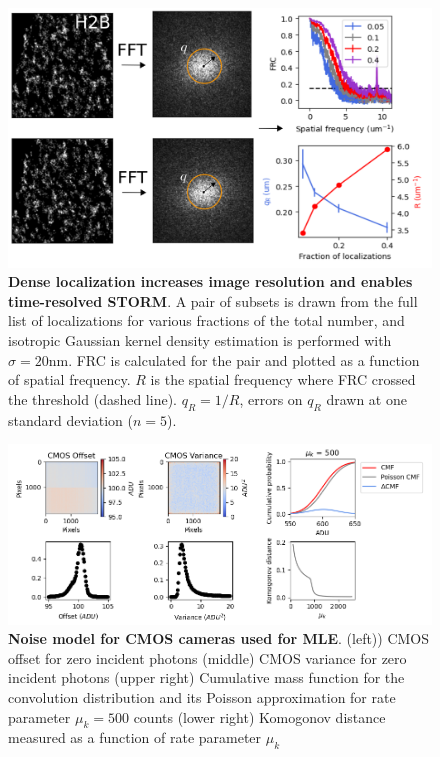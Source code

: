 \documentclass{ucetd}
\begin{document}
\begin{figure}
\begin{center}
\includegraphics[width=13cm]{FRC.png}
\end{center}
\caption{\textbf{Dense localization increases image resolution and enables time-resolved STORM}. A pair of subsets is drawn from the full list of localizations for various fractions of the total number, and isotropic Gaussian kernel density estimation is performed with $\sigma=20\mathrm{nm}$. FRC is calculated for the pair and plotted as a function of spatial frequency. $R$ is the spatial frequency where FRC crossed the threshold (dashed line). $q_{R} = 1/R$, errors on $q_{R}$ drawn at one standard deviation ($n=5$). }
\end{figure}
\clearpage
\begin{figure}
\begin{center}
\includegraphics[width=16cm]{Noise.png}
\end{center}
\caption{\textbf{Noise model for CMOS cameras used for MLE}. (left)) CMOS offset for zero incident photons (middle) CMOS variance for zero incident photons (upper right) Cumulative mass function for the convolution distribution and its Poisson approximation for rate parameter $\mu_{k} = 500$ counts (lower right) Komogonov distance measured as a function of rate parameter $\mu_{k}$}
\end{figure}
\end{document}
